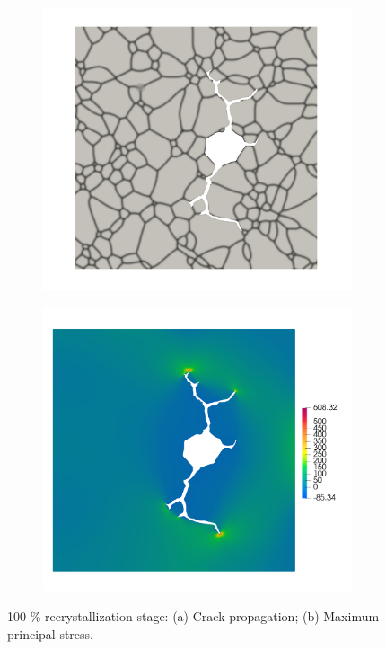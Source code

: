 \begin{figure}[htb!]
  \centering
  \begin{subfigure}[t]{0.49\linewidth}
    \centering
    \includegraphics[width=\linewidth]{Chapter3/figures/partial_hbs_3}
    \caption{}
  \end{subfigure}
  \begin{subfigure}[t]{0.49\linewidth}
    \centering
    \includegraphics[width=\linewidth]{Chapter3/figures/partial_hbs_3_stress}
    \caption{}
  \end{subfigure}
  \caption{\label{fig:partial_hbs_3} 100 $\%$ recrystallization stage: (a) Crack propagation; (b) Maximum principal stress.}
\end{figure}
